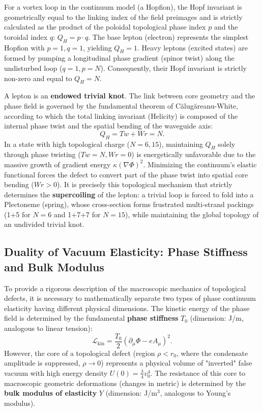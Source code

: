 \documentclass[11pt,a4paper]{article}
\begin{document}
	For a vortex loop in the continuum model (a Hopfion), the Hopf invariant is geometrically equal to the linking index of the field preimages and is strictly calculated as the product of the poloidal topological phase index $p$ and the toroidal index $q$: $Q_H = p \cdot q$.
	The base lepton (electron) represents the simplest Hopfion with $p=1, q=1$, yielding $Q_H = 1$. Heavy leptons (excited states) are formed by pumping a longitudinal phase gradient (spinor twist) along the undisturbed loop ($q=1, p=N$). Consequently, their Hopf invariant is strictly non-zero and equal to $Q_H = N$.
	
	A lepton is an \textbf{endowed trivial knot}. The link between core geometry and the phase field is governed by the fundamental theorem of Călugăreanu-White, according to which the total linking invariant (Helicity) is composed of the internal phase twist and the spatial bending of the waveguide axis:
	\begin{equation}
		Q_H = Tw + Wr = N.
	\end{equation}
	In a state with high topological charge ($N=6, 15$), maintaining $Q_H$ solely through phase twisting ($Tw=N, Wr=0$) is energetically unfavorable due to the massive growth of gradient energy $\kappa (\nabla \Phi)^2$. Minimizing the continuum's elastic functional forces the defect to convert part of the phase twist into spatial core bending ($Wr > 0$).
	It is precisely this topological mechanism that strictly determines the \textbf{supercoiling} of the lepton: a trivial loop is forced to fold into a Plectoneme (spring), whose cross-section forms frustrated multi-strand packings (1+5 for $N=6$ and 1+7+7 for $N=15$), while maintaining the global topology of an undivided trivial knot.
	
\subsection{Duality of Vacuum Elasticity: Phase Stiffness and Bulk Modulus}
	To provide a rigorous description of the macroscopic mechanics of topological defects, it is necessary to mathematically separate two types of phase continuum elasticity having different physical dimensions.
	The kinetic energy of the phase field is determined by the fundamental \textbf{phase stiffness} $T_0$ (dimension: J/m, analogous to linear tension):
	\begin{equation}
		\mathcal{L}_{\text{kin}} = \frac{T_0}{2} (\partial_\mu \Phi - e A_\mu)^2.
	\end{equation}
	However, the core of a topological defect (region $\rho < r_0$, where the condensate amplitude is suppressed, $\rho \to 0$) represents a physical volume of "inverted" false vacuum with high energy density $U(0) = \frac{\lambda}{4}v_0^4$. The resistance of this core to macroscopic geometric deformations (changes in metric) is determined by the \textbf{bulk modulus of elasticity} $Y$ (dimension: J/m$^3$, analogous to Young's modulus). 
	
\end{document}
